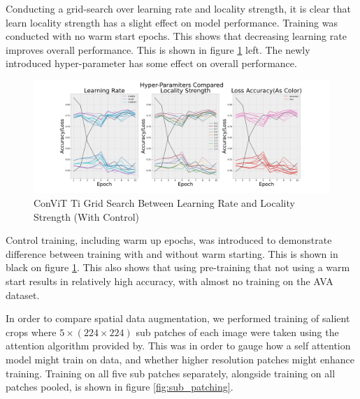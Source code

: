 Conducting a grid-search over learning rate and locality strength, it is clear that learn locality strength has a slight effect on model performance. Training was conducted with no warm start epochs. This shows that decreasing learning rate improves overall performance. This is shown in figure \ref{fig:ConViT_grid} left. The newly introduced hyper-parameter has some effect on overall performance.

\begin{figure}[htp!]
    \centering
    \includegraphics[width=\textwidth]{figures/results_and_discussion/hyper-params_compared.pdf}
    \caption{ConViT Ti Grid Search Between Learning Rate and Locality Strength (With Control)}
    \label{fig:ConViT_grid}
\end{figure} 

Control training, including warm up epochs, was introduced to demonstrate difference between training with and without warm starting. This is shown in black on figure \ref{fig:ConViT_grid}. This also shows that using pre-training that not using a warm start results in relatively high accuracy, with almost no training on the AVA  dataset. 

In order to compare spatial data augmentation, we performed training of salient crops where $5 \times (224 \times 224)$ sub patches of each image were taken using the attention algorithm provided by\cite{Ma2017}. This was in order to gauge how a self attention model might train on data, and whether higher resolution patches might enhance training. Training on all five sub patches separately, alongside training on all patches pooled, is shown in figure \ref{fig:sub_patching}. 


